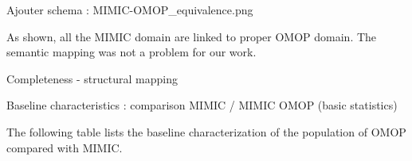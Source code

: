 Ajouter schema : MIMIC-OMOP\_equivalence.png

As shown, all the MIMIC domain are linked to proper OMOP domain. 
The semantic mapping was not a problem for our work.

Completeness - structural mapping 

Baseline characteristics : comparison MIMIC / MIMIC OMOP (basic statistics)

The following table lists the baseline characterization of the population of
OMOP compared with MIMIC.

\begin{table*}[t]
\end{table*}
